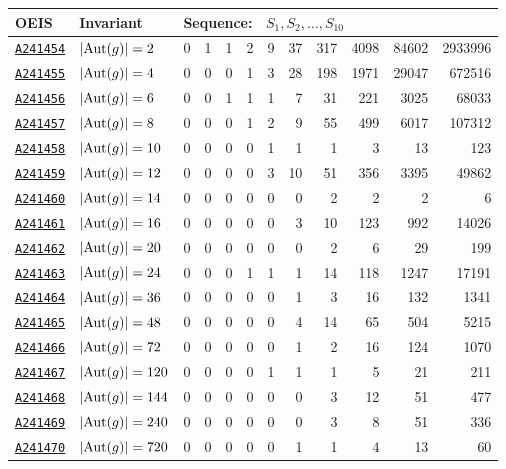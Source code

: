 \documentclass[12pt]{article}
\newcommand{\OEIS}[1]
{\href{https://oeis.org/#1}{\texttt{#1}}}
\begin{document}
\begin{appendices}
\begin{longtable}{ l l r r r r r r r r r r}
\toprule
OEIS & Invariant & 
\multicolumn{10}{l}{Sequence: \ $S_1, S_2, \ldots, S_{10}$} 
\\
\midrule\bottomrule
\OEIS{A241454} & $| \text{Aut}(g) | =2$ & 0 & 1 & 1 & 2 & 9 & 37 & 317 & 4098 & 84602 & 2933996 \\
\OEIS{A241455} & $| \text{Aut}(g) | =4$ & 0 & 0 & 0 & 1 & 3 & 28 & 198 & 1971 & 29047 & 672516 \\
\OEIS{A241456} & $| \text{Aut}(g) | =6$ & 0 & 0 & 1 & 1 & 1 & 7 & 31 & 221 & 3025 & 68033 \\
\OEIS{A241457} & $| \text{Aut}(g) | =8$ & 0 & 0 & 0 & 1 & 2 & 9 & 55 & 499 & 6017 & 107312 \\
\OEIS{A241458} & $| \text{Aut}(g) | =10$ & 0 & 0 & 0 & 0 & 1 & 1 & 1 & 3 & 13 & 123 \\
\OEIS{A241459} & $| \text{Aut}(g) | =12$ & 0 & 0 & 0 & 0 & 3 & 10 & 51 & 356 & 3395 & 49862 \\
\OEIS{A241460} & $| \text{Aut}(g) | =14$ & 0 & 0 & 0 & 0 & 0 & 0 & 2 & 2 & 2 & 6 \\
\OEIS{A241461} & $| \text{Aut}(g) | =16$ & 0 & 0 & 0 & 0 & 0 & 3 & 10 & 123 & 992 & 14026 \\
\OEIS{A241462} & $| \text{Aut}(g) | =20$ & 0 & 0 & 0 & 0 & 0 & 0 & 2 & 6 & 29 & 199 \\
\OEIS{A241463} & $| \text{Aut}(g) | =24$ & 0 & 0 & 0 & 1 & 1 & 1 & 14 & 118 & 1247 & 17191 \\
\OEIS{A241464} & $| \text{Aut}(g) | =36$ & 0 & 0 & 0 & 0 & 0 & 1 & 3 & 16 & 132 & 1341 \\
\OEIS{A241465} & $| \text{Aut}(g) | =48$ & 0 & 0 & 0 & 0 & 0 & 4 & 14 & 65 & 504 & 5215 \\
\OEIS{A241466} & $| \text{Aut}(g) | =72$ & 0 & 0 & 0 & 0 & 0 & 1 & 2 & 16 & 124 & 1070 \\
\OEIS{A241467} & $| \text{Aut}(g) | =120$ & 0 & 0 & 0 & 0 & 1 & 1 & 1 & 5 & 21 & 211 \\
\OEIS{A241468} & $| \text{Aut}(g) | =144$ & 0 & 0 & 0 & 0 & 0 & 0 & 3 & 12 & 51 & 477 \\
\OEIS{A241469} & $| \text{Aut}(g) | =240$ & 0 & 0 & 0 & 0 & 0 & 0 & 3 & 8 & 51 & 336 \\
\OEIS{A241470} & $| \text{Aut}(g) | =720$ & 0 & 0 & 0 & 0 & 0 & 1 & 1 & 4 & 13 & 60 \\

\end{longtable}
\end{appendices}
\end{document}
